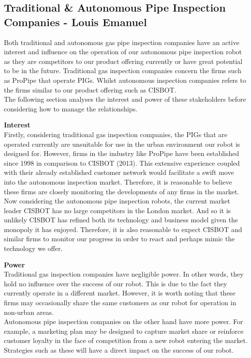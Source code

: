 \documentclass[11pt]{article}		%
\begin{document}
		\subsection[Traditional \& Autonomous Pipe Inspection Companies]{Traditional \& Autonomous Pipe Inspection Companies - Louis Emanuel}
            Both traditional and autonomous gas pipe inspection companies have an active interest and influence on the operation of our autonomous pipe inspection robot as they are competitors to our product offering currently or have great potential to be in the future. Traditional gas inspection companies concern the firms such as ProPipe that operate PIGs. Whilst autonomous inspection companies refers to the firms similar to our product offering such as CISBOT. \\
            \hspace*{3ex}The following section analyses the interest and power of these stakeholders before considering how to manage the relationships.
            
            \textbf{Interest}\\
            Firstly, considering traditional gas inspection companies, the PIGs that are operated currently are unsuitable for use in the urban environment our robot is designed for. However, firms in the industry like ProPipe have been established since 1998 in comparison to CISBOT (2013). This extensive experience coupled with their already established customer network would facilitate a swift move into the autonomous inspection market. Therefore, it is reasonable to believe these firms are closely monitoring the developments of any firms in the market. \\
            \hspace*{3ex}Now considering the autonomous pipe inspection robots, the current market leader CISBOT has no large competitors in the London market. And so it is unlikely CISBOT has refined both its technology and business model given the monopoly it has enjoyed. Therefore, it is also reasonable to expect CISBOT and similar firms to monitor our progress in order to react and perhaps mimic the technology we offer. 
            
            \textbf{Power}\\
            Traditional gas inspection companies have negligible power. In other words, they hold no influence over the success of our robot. This is due to the fact they currently operate in a different market. However, it is worth noting that these firms may occasionally share the same customers as our robot for operation in non-urban areas. \\
            \hspace*{3ex}Autonomous pipe inspection companies on the other hand have more power. For example, a marketing plan may be designed to capture market share or reinforce customer loyalty in the face of competition from a new robot entering the market. Strategies such as these will have a direct impact on the success of our robot. 
            
\end{document}

